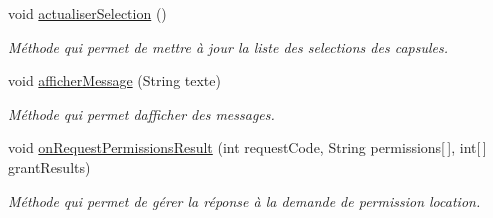 \begin{DoxyCompactItemize}
void \hyperlink{classcom_1_1example_1_1ekawa_1_1_ihm_a2d7fd2fe397785acc2b9a32e65cfd52f}{actualiser\+Selection} ()
\begin{DoxyCompactList}\small\item\em Méthode qui permet de mettre à jour la liste des selections des capsules. \end{DoxyCompactList}\item 
void \hyperlink{classcom_1_1example_1_1ekawa_1_1_ihm_ab1ca33ad18d42540299e3a58a82f4d9a}{afficher\+Message} (String texte)
\begin{DoxyCompactList}\small\item\em Méthode qui permet d\textquotesingle{}afficher des messages. \end{DoxyCompactList}\item 
void \hyperlink{classcom_1_1example_1_1ekawa_1_1_ihm_a708f7d3adb02a942cb67a5d6ec42b64f}{on\+Request\+Permissions\+Result} (int request\+Code, String permissions\mbox{[}$\,$\mbox{]}, int\mbox{[}$\,$\mbox{]} grant\+Results)
\begin{DoxyCompactList}\small\item\em Méthode qui permet de gérer la réponse à la demande de permission location. \end{DoxyCompactList}\end{DoxyCompactItemize}
